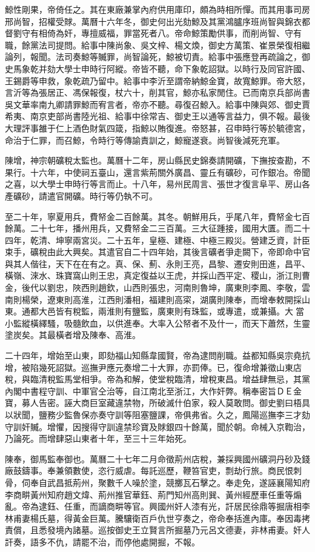 \begin{pinyinscope}
鯨性剛果，帝倚任之。其在東廠兼掌內府供用庫印，頗為時相所憚。而其用事司房邢尚智，招權受賕。萬曆十六年冬，御史何出光劾鯨及其黨鴻臚序班尚智與錦衣都督劉守有相倚為奸，專擅威福，罪當死者八。帝命鯨策勵供事，而削尚智、守有職，餘黨法司提問。給事中陳尚象、吳文梓、楊文煥，御史方萬策、崔景榮復相繼論列，報聞。法司奏鯨等贓罪，尚智論死，鯨被切責。給事中張應登再疏論之，御史馬象乾并劾大學士申時行阿縱。帝皆不聽，命下象乾詔獄。以時行及同官許國、王錫爵等申救，象乾疏乃留中。給事中李沂至謂帝納鯨金寶，故寬鯨罪。帝大怒，言沂等為張居正、馮保報復，杖六十，削其官，鯨亦私家閒住。已而南京兵部尚書吳文華率南九卿請罪鯨而宥言者，帝亦不聽。尋復召鯨入。給事中陳與郊、御史賈希夷、南京吏部尚書陸光祖、給事中徐常吉、御史王以通等言益力，俱不報。最後大理評事雒于仁上酒色財氣四箴，指鯨以賄復進。帝怒甚，召申時行等於毓德宮，命治于仁罪，而召鯨，令時行等傳諭責訓之，鯨寵遂衰。尚智後減死充軍。

陳增，神宗朝礦稅太監也。萬曆十二年，房山縣民史錦奏請開礦，下撫按查勘，不果行。十六年，中使祠五臺山，還言紫荊關外廣昌、靈丘有礦砂，可作銀冶。帝聞之喜，以大學士申時行等言而止。十八年，易州民周言、張世才復言阜平、房山各產礦砂，請遣官開礦。時行等仍執不可。

至二十年，寧夏用兵，費帑金二百餘萬。其冬。朝鮮用兵，乎尾八年，費帑金七百餘萬。二十七年，播州用兵，又費帑金二三百萬。三大征踵接，國用大匱。而二十四年，乾清、坤寧兩宮災。二十五年，皇極、建極、中極三殿災。營建乏資，計臣束手，礦稅由此大興矣。其遣官自二十四年始，其後言礦者爭走闕下，帝即命中官與其人偕往，天下在在有之。真、保、薊、永則王亮，昌黎、遷安則田進，昌平、橫嶺、淶水、珠寶窩山則王忠，真定復益以王虎，并採山西平定、稷山，浙江則曹金，後代以劉忠，陜西則趙欽，山西則張忠，河南則魯坤，廣東則李鳳、李敬，雲南則楊榮，遼東則高淮，江西則潘相，福建則高寀，湖廣則陳奉，而增奉敕開採山東。通都大邑皆有稅監，兩淮則有鹽監，廣東則有珠監，或專遣，或兼攝。大當小監縱橫繹騷，吸髓飲血，以供進奉。大率入公帑者不及什一，而天下蕭然，生靈塗炭矣。其最橫者增及陳奉、高淮。

二十四年，增始至山東，即劾福山知縣韋國賢，帝為逮問削職。益都知縣吳宗堯抗增，被陷幾死詔獄。巡撫尹應元奏增二十大罪，亦罰俸。已，復命增兼徵山東店稅，與臨清稅監馬堂相爭。帝為和解，使堂稅臨清，增稅東昌。增益肆無忌，其黨內閣中書程守訓、中軍官仝治等，自江南北至浙江，大作奸弊。稱奉密旨ＤＥ金寶，募人告密。誣大商巨室藏違禁物，所破滅什伯家，殺人莫敢問。御史劉曰梧具以狀聞，鹽務少監魯保亦奏守訓等阻塞鹽課，帝俱弗省。久之，鳳陽巡撫李三才劾守訓奸贓。增懼，因搜得守訓違禁珍寶及賕銀四十餘萬，聞於朝。命械入京鞫治，乃論死。而增肆惡山東者十年，至三十三年始死。

陳奉，御馬監奉御也。萬曆二十七年二月命徵荊州店稅，兼採興國州礦洞丹砂及錢廠鼓鑄事。奉兼領數使，恣行威虐。每託巡歷，鞭笞官吏，剽劫行旅。商民恨刺骨，伺奉自武昌抵荊州，聚數千人噪於塗，競擲瓦石擊之。奉走免，遂誣襄陽知府李商畊黃州知府趙文煒、荊州推官華鈺、荊門知州高則巽、黃州經歷車任重等煽亂。帝為逮鈺、任重，而謫商畊等官。興國州奸人漆有光，訐居民徐鼎等掘唐相李林甫妻楊氏墓，得黃金巨萬。騰驤衛百戶仇世亨奏之，帝命奉括進內庫。奉因毒拷責償，且悉發境內諸墓。巡按御史王立賢言所掘墓乃元呂文德妻，非林甫妻。奸人訐奏，語多不仇，請罷不治，而停他處開掘，不報。


\end{pinyinscope}
